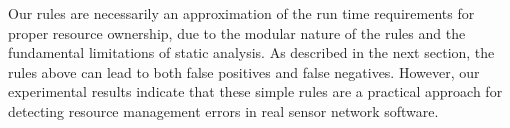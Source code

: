 Our rules are necessarily an approximation of the run time requirements for
proper resource ownership, due to the modular nature of the rules and the
fundamental limitations of static analysis.  
%
%
As described in the next section, the rules above can lead to both false
positives and false negatives.  
%
However, our experimental results indicate that these simple rules are a
practical approach for detecting resource management errors in real sensor
network software.

